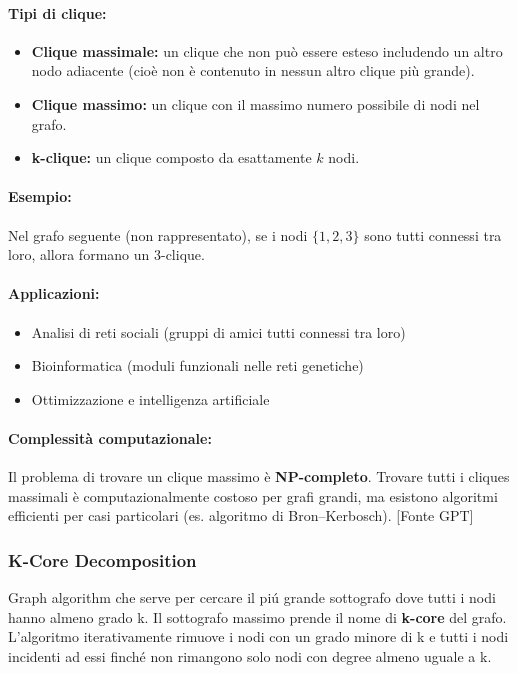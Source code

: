 \paragraph{Tipi di clique:}
\begin{itemize}
    \item \textbf{Clique massimale:} un clique che non può essere esteso includendo un altro nodo adiacente (cioè non è contenuto in nessun altro clique più grande).
    \item \textbf{Clique massimo:} un clique con il massimo numero possibile di nodi nel grafo.
    \item \textbf{k-clique:} un clique composto da esattamente \( k \) nodi.
\end{itemize}

\paragraph{Esempio:}
Nel grafo seguente (non rappresentato), se i nodi \( \{1, 2, 3\} \) sono tutti connessi tra loro, allora formano un 3-clique.

\paragraph{Applicazioni:}
\begin{itemize}
    \item Analisi di reti sociali (gruppi di amici tutti connessi tra loro)
    \item Bioinformatica (moduli funzionali nelle reti genetiche)
    \item Ottimizzazione e intelligenza artificiale
\end{itemize}

\paragraph{Complessità computazionale:}
Il problema di trovare un clique massimo è \textbf{NP-completo}. Trovare tutti i cliques massimali è computazionalmente costoso per grafi grandi, ma esistono algoritmi efficienti per casi particolari (es. algoritmo di Bron–Kerbosch). [Fonte GPT]

\subsubsection*{K-Core Decomposition}
Graph algorithm che serve per cercare il piú grande sottografo dove tutti i nodi hanno almeno grado k. Il sottografo massimo prende il nome di \textbf{k-core} del grafo. 
\\
L'algoritmo iterativamente rimuove i nodi con un grado minore di k e tutti i nodi incidenti ad essi finché non rimangono solo nodi con degree almeno uguale a k. 

